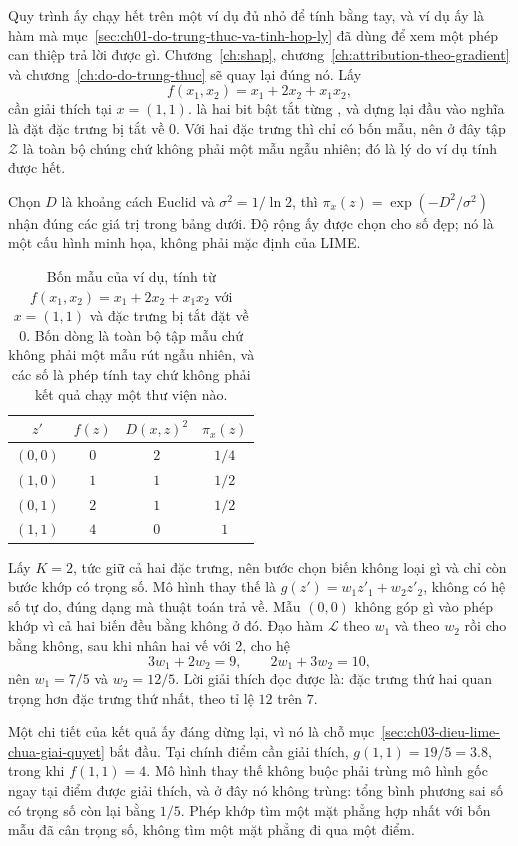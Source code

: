 Quy trình ấy chạy hết trên một ví dụ đủ nhỏ để tính bằng tay, và ví dụ ấy là
hàm mà mục~\ref{sec:ch01-do-trung-thuc-va-tinh-hop-ly} đã dùng để xem một phép
can thiệp trả lời được gì. Chương~\ref{ch:shap}, chương~\ref{ch:attribution-theo-gradient}
và chương~\ref{ch:do-do-trung-thuc} sẽ quay lại đúng nó. Lấy
\[
  f(x_1,x_2) = x_1 + 2x_2 + x_1 x_2 ,
\]
cần giải thích tại $x = (1,1)$.  là hai bit bật tắt
từng , và dựng lại đầu vào nghĩa là đặt đặc trưng bị tắt về 0. Với hai
đặc trưng thì chỉ có bốn mẫu, nên ở đây tập $\mathcal{Z}$ là toàn bộ chúng chứ
không phải một mẫu ngẫu nhiên; đó là lý do ví dụ tính được hết.

Chọn $D$ là khoảng cách Euclid và $\sigma^2 = 1/\ln 2$, thì
$\pi_x(z) = \exp(-D^2/\sigma^2)$ nhận đúng các giá trị trong bảng dưới. Độ rộng
ấy được chọn cho số đẹp; nó là một cấu hình minh họa, không phải mặc định của
LIME.

\begin{table}[htbp]
  \centering
  \caption{Bốn mẫu của ví dụ, tính từ $f(x_1,x_2) = x_1 + 2x_2 + x_1x_2$ với
  $x = (1,1)$ và đặc trưng bị tắt đặt về 0. Bốn dòng là toàn bộ tập mẫu chứ
  không phải một mẫu rút ngẫu nhiên, và các số là phép tính tay chứ không phải
  kết quả chạy một thư viện nào.}
  \label{tab:ch03-vi-du-bon-mau}
  \begin{tabular}{@{}cccc@{}}
    \toprule
    $z'$ & $f(z)$ & $D(x,z)^2$ & $\pi_x(z)$ \\
    \midrule
    $(0,0)$ & $0$ & $2$ & $1/4$ \\
    $(1,0)$ & $1$ & $1$ & $1/2$ \\
    $(0,1)$ & $2$ & $1$ & $1/2$ \\
    $(1,1)$ & $4$ & $0$ & $1$ \\
    \bottomrule
  \end{tabular}
\end{table}

Lấy $K = 2$, tức giữ cả hai đặc trưng, nên bước chọn biến không loại gì và chỉ
còn bước khớp có trọng số. Mô hình thay thế là $g(z') = w_1 z'_1 + w_2 z'_2$,
không có hệ số tự do, đúng dạng mà thuật toán trả về. Mẫu $(0,0)$ không góp gì
vào phép khớp vì cả hai biến đều bằng không ở đó. Đạo hàm
$\mathcal{L}$ theo $w_1$ và theo $w_2$ rồi cho bằng không, sau khi nhân hai vế
với 2, cho hệ
\[
  3w_1 + 2w_2 = 9, \qquad 2w_1 + 3w_2 = 10 ,
\]
nên $w_1 = 7/5$ và $w_2 = 12/5$. Lời giải thích đọc được là: đặc trưng thứ hai
quan trọng hơn đặc trưng thứ nhất, theo tỉ lệ $12$ trên $7$.

Một chi tiết của kết quả ấy đáng dừng lại, vì nó là chỗ
mục~\ref{sec:ch03-dieu-lime-chua-giai-quyet} bắt đầu.
Tại chính điểm cần giải thích, $g(1,1) = 19/5 = 3.8$, trong khi $f(1,1) = 4$.
Mô hình thay thế không buộc phải trùng mô hình gốc ngay tại điểm được giải
thích, và ở đây nó không trùng: tổng bình phương sai số có trọng số còn lại
bằng $1/5$. Phép khớp tìm một mặt phẳng hợp nhất với bốn mẫu đã cân trọng số,
không tìm một mặt phẳng đi qua một điểm.


